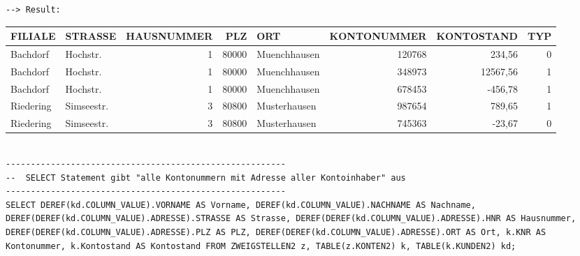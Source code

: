 \documentclass{scrartcl}
\begin{document}
\begin{landscape}
\begin{lstlisting}
--> Result:
\end{lstlisting}
\begin{tabular}{ l l r r l r r r }
FILIALE     &         STRASSE             &           HAUSNUMMER    &    PLZ & ORT            &      KONTONUMMER & KONTOSTAND    &    TYP \\
\hline
Bachdorf         &    Hochstr.   &                             1   &   80000 & Muenchhausen  &             120768  &   234,56   &       0 \\
Bachdorf       &      Hochstr.     &                           1   &   80000 & Muenchhausen   &            348973 &  12567,56      &    1 \\
Bachdorf    &         Hochstr.      &                          1  &    80000&  Muenchhausen   &            678453  &  -456,78    &      1 \\
Riedering    &        Simseestr.    &                          3   &   80800& Musterhausen    &          987654   &  789,65    &      1 \\
Riedering    &        Simseestr.    &                          3  &    80800& Musterhausen    &          745363  &   -23,67    &      0 \\
\end{tabular}

\begin{lstlisting}

--------------------------------------------------------
--  SELECT Statement gibt "alle Kontonummern mit Adresse aller Kontoinhaber" aus
--------------------------------------------------------
SELECT DEREF(kd.COLUMN_VALUE).VORNAME AS Vorname, DEREF(kd.COLUMN_VALUE).NACHNAME AS Nachname, DEREF(DEREF(kd.COLUMN_VALUE).ADRESSE).STRASSE AS Strasse, DEREF(DEREF(kd.COLUMN_VALUE).ADRESSE).HNR AS Hausnummer, DEREF(DEREF(kd.COLUMN_VALUE).ADRESSE).PLZ AS PLZ, DEREF(DEREF(kd.COLUMN_VALUE).ADRESSE).ORT AS Ort, k.KNR AS Kontonummer, k.Kontostand AS Kontostand FROM ZWEIGSTELLEN2 z, TABLE(z.KONTEN2) k, TABLE(k.KUNDEN2) kd;


\end{lstlisting}
\end{landscape}
\end{document}
